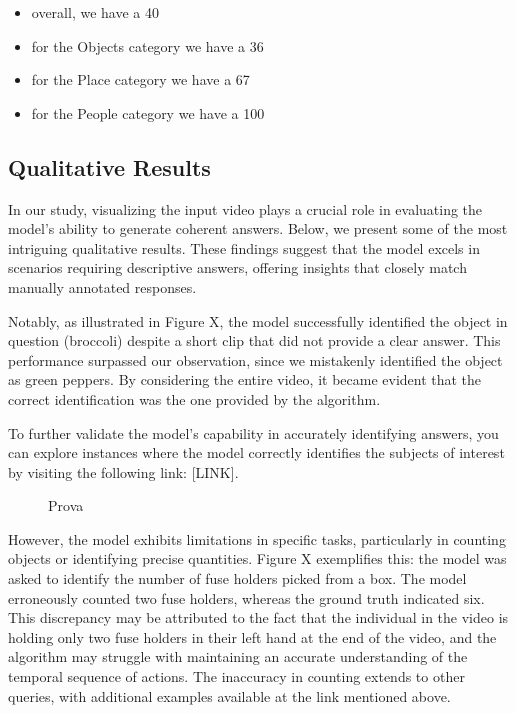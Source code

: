 \documentclass[conference]{IEEEtran}
\begin{document}
\begin{itemize}[before=\footnotesize]
    \item overall, we have a 40%
    \item for the Objects category we have a 36%
    \item for the Place category we have a 67%
    \item for the People category we have a 100%
   
\end{itemize}



\subsection{Qualitative Results}
In our study, visualizing the input video plays a crucial role in evaluating the model's ability to generate coherent answers. Below, we present some of the most intriguing qualitative results. These findings suggest that the model excels in scenarios requiring descriptive answers, offering insights that closely match manually annotated responses.

Notably, as illustrated in Figure X, the model successfully identified the object in question (broccoli) despite a short clip that did not provide a clear answer. This performance surpassed our observation, since we mistakenly identified the object as green peppers. By considering the entire video, it became evident that the correct identification was the one provided by the algorithm.

To further validate the model’s capability in accurately identifying answers, you can explore instances where the model correctly identifies the subjects of interest by visiting the following link: [LINK].

\begin{figure}[ht]
  \centering
  \caption{Prova}
  \label{fig:animation}
\end{figure}

However, the model exhibits limitations in specific tasks, particularly in counting objects or identifying precise quantities. Figure X exemplifies this: the model was asked to identify the number of fuse holders picked from a box. The model erroneously counted two fuse holders, whereas the ground truth indicated six. This discrepancy may be attributed to the fact that the individual in the video is holding only two fuse holders in their left hand at the end of the video, and the algorithm may struggle with maintaining an accurate understanding of the temporal sequence of actions.
The inaccuracy in counting extends to other queries, with additional examples available at the link mentioned above.
\end{document}
